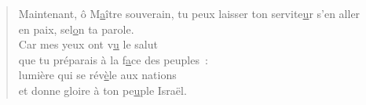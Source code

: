 \begin{verse}
Maintenant, ô M\underline{a}ître souverain, \psalmdagger
tu peux laisser ton servite\underline{u}r s'en aller\\
en paix, sel\underline{o}n ta parole.\\

Car mes yeux ont v\underline{u} le salut\\
que tu préparais à la f\underline{a}ce des peuples :\\

lumière qui se rév\underline{è}le aux nations\\
et donne gloire à ton pe\underline{u}ple Israël.
\end{verse}

